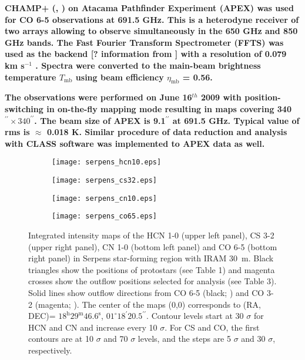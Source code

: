 \documentclass{aa}
\begin{document}
\textbf{CHAMP+ (\citealt{Kas06}, \citealt{Gus08}) on Atacama Pathfinder Experiment (APEX) was used for CO 6-5 observations at 691.5 GHz. This is a heterodyne receiver of two arrays allowing to observe simultaneously in the 650 GHz and 850 GHz bands. The Fast Fourier Transform Spectrometer
(FFTS) was used as the backend [? information from \citep{Yil15}] with a resolution of 0.079 km s$^{-1}$ \citep{Kle06}. Spectra were
converted to the main-beam brightness temperature $T_\mathrm{mb}$ using beam efficiency $\eta_\mathrm{mb}$ = 0.56.} 

\textbf{The observations were performed on June 16$^{th}$ 2009 with position-switching in on-the-fly mapping mode resulting in maps covering 340$^{\prime\prime}\times 340^{\prime\prime}$. The beam size of APEX is 9.1$^{\prime\prime}$ at 691.5 GHz. Typical value of rms is $\approx$ 0.018 K. Similar procedure of data reduction and analysis with CLASS software was implemented to APEX data as well.} 
\begin{figure*}
\centering 
\begin{subfigure}{.45\textwidth} \label{1map} 
\centering
\texttt{[image: serpens\_hcn10.eps]} 
\caption{} 
\end{subfigure}
\begin{subfigure}{.45\textwidth} 
\label{2map} 
\centering
\texttt{[image: serpens\_cs32.eps]} 
\caption{} 
\end{subfigure}
\begin{subfigure}{.45\textwidth} 
\label{3map} 
\centering
\texttt{[image: serpens\_cn10.eps]} 
\caption{} \end{subfigure}
\begin{subfigure}{.45\textwidth} 
\label{4map} 
\centering
\texttt{[image: serpens\_co65.eps]} 
\caption{} \end{subfigure}
\caption{\label{iram_maps} Integrated intensity maps of the HCN 1-0 (upper left panel), CS
3-2 (upper right panel), CN 1-0 (bottom left panel) and CO 6-5 (bottom right panel) in
Serpens star-forming region with IRAM 30~m. Black triangles show the positions of protostars
(see Table 1) and magenta crosses show the outflow positions selected for analysis (see Table 3). 
Solid lines show outflow directions from CO 6-5 (black; \citealt{Yil15}) and
 CO 3-2 (magenta; \citealt{Dio10}). The center of the maps (0,0) corresponds 
 to (RA, DEC)= $18^{\mathrm{h}} 29^{\mathrm{m}} 46.6^{\mathrm{s}}$, $01^{\circ}
18^{\prime} 20.5 ^{\prime\prime}$. Contour levels start at 30 $\sigma$
 for HCN and CN and increase every 10 $\sigma$. For CS and CO, the first contours 
are at 10 $\sigma$ and 70 $\sigma$ levels, and the steps are 5 $\sigma$ and 
30 $\sigma$, respectively.} 
\end{figure*}
\end{document}
